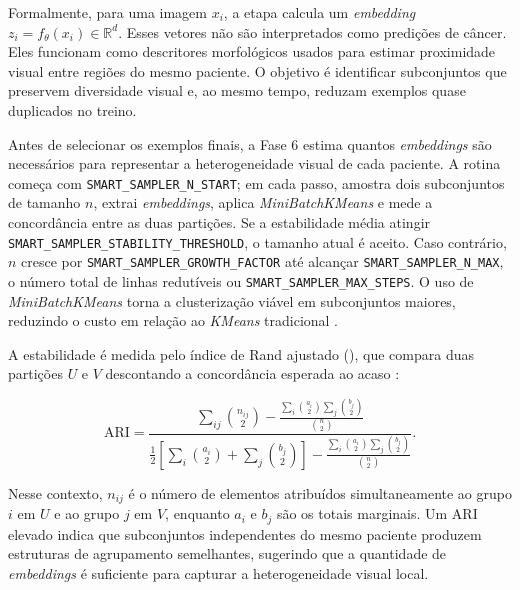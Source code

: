 Formalmente, para uma imagem $x_i$, a etapa calcula um \textit{embedding}
$z_i=f_\theta(x_i)\in\mathbb{R}^d$. Esses vetores não são interpretados como
predições de câncer. Eles funcionam como descritores morfológicos usados para
estimar proximidade visual entre regiões do mesmo paciente. O objetivo é
identificar subconjuntos que preservem diversidade visual e, ao mesmo tempo,
reduzam exemplos quase duplicados no treino.

Antes de selecionar os exemplos finais, a Fase 6 estima quantos \textit{embeddings} são
necessários para representar a heterogeneidade visual de cada paciente. A rotina
começa com \texttt{SMART\_SAMPLER\_N\_START}; em cada passo, amostra dois
subconjuntos de tamanho $n$, extrai \textit{embeddings}, aplica \textit{MiniBatchKMeans} e mede a
concordância entre as duas partições. Se a estabilidade média atingir
\texttt{SMART\_SAMPLER\_STABILITY\_THRESHOLD}, o tamanho atual é aceito. Caso
contrário, $n$ cresce por \texttt{SMART\_SAMPLER\_GROWTH\_FACTOR} até alcançar
\texttt{SMART\_SAMPLER\_N\_MAX}, o número total de linhas redutíveis ou
\texttt{SMART\_SAMPLER\_MAX\_STEPS}. O uso de \textit{MiniBatchKMeans} torna a
clusterização viável em subconjuntos maiores, reduzindo o custo em relação ao
\textit{KMeans} tradicional \cite{sculley2010webscale}.

A estabilidade é medida pelo índice de Rand ajustado
(), que compara duas partições $U$ e
$V$ descontando a concordância esperada ao acaso \cite{hubert1985comparing}:

\begin{equation}
    \mathrm{ARI} =
    \frac{
    \sum_{ij}\binom{n_{ij}}{2}
    -
    \frac{\sum_i\binom{a_i}{2}\sum_j\binom{b_j}{2}}{\binom{n}{2}}
    }{
    \frac{1}{2}\left[
    \sum_i\binom{a_i}{2}+\sum_j\binom{b_j}{2}
    \right]
    -
    \frac{\sum_i\binom{a_i}{2}\sum_j\binom{b_j}{2}}{\binom{n}{2}}
    } .
    \label{eq:ari}
\end{equation}

Nesse contexto, $n_{ij}$ é o número de elementos atribuídos simultaneamente ao
grupo $i$ em $U$ e ao grupo $j$ em $V$, enquanto $a_i$ e $b_j$ são os totais
marginais. Um ARI elevado indica que subconjuntos independentes do mesmo
paciente produzem estruturas de agrupamento semelhantes, sugerindo que a quantidade de \textit{embeddings} é suficiente para capturar a heterogeneidade visual
local.

